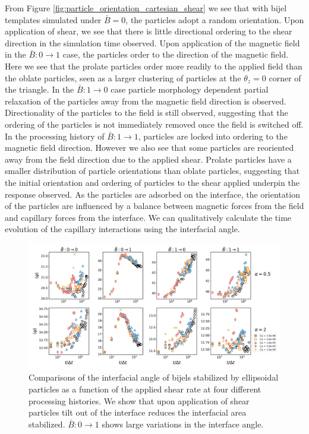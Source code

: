 From Figure \ref{fig:particle_orientation_cartesian_shear} we see that with bijel templates simulated under $\bar{B} = 0$, the
particles adopt a random orientation. Upon application of shear, we see that there is little directional ordering to the 
shear direction in the simulation time observed. Upon application of the magnetic field in the $\bar{B}:0 \rightarrow 1$ case, 
the particles order to the direction of the magnetic field. Here we see that the prolate particles order more readily to the applied
field than the oblate particles, seen as a larger clustering of particles at the $\theta_z = 0$ corner of the triangle. In the 
$\bar{B}:1 \rightarrow 0$ case particle morphology dependent partial relaxation of the particles away from the magnetic field direction 
is observed. Directionality of the particles to the field is still observed, suggesting that the ordering of the particles is not
immediately removed once the field is switched off. In the processing history of $\bar{B}:1 \rightarrow 1$, particles are locked
into ordering to the magnetic field direction. However we also see that some particles are reoriented away from the field direction
due to the applied shear. Prolate particles have a smaller distribution of particle orientations than oblate particles, suggesting that
the initial orientation and ordering of particles to the shear applied underpin the response observed. As the particles are adsorbed on the 
interface, the orientation of the particles are influenced by a balance between magnetic forces from the field and capillary forces 
from the interface. We can qualitatively calculate the time evolution of the capillary interactions using the interfacial angle.

\begin{figure} 
    \centering 
    \includegraphics[scale=0.3]{../figures/results/paper3/psi-time_compare.png} 
    \caption{Comparisons of the interfacial angle of bijels stabilized by ellipsoidal particles as a function of 
             the applied shear rate at four different processing histories. We show that upon application of shear
             particles tilt out of the interface reduces the interfacial area stabilized. $\bar{B}: 0 \to 1$ shows 
             large variations in the interface angle.} 
    \label{fig:interface_angle_shear} 
\end{figure}

